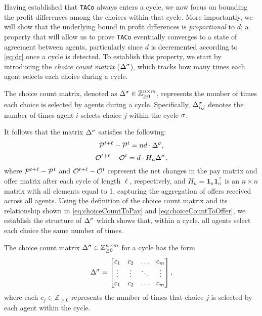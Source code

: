 Having established that \texttt{TACo} always enters a cycle, we now focus on bounding the profit differences among the choices within that cycle. More importantly, we will show that the underlying bound in profit differences is \textit{proportional} to $d$; a property that will allow us to prove  \texttt{TACo} eventually converges to a state of agreement between agents, particularly since $d$ is decremented according to \eqref{eq:dr} once a cycle is detected.  To establish this property, we start by introducing the \textit{choice count matrix} (\(\Delta^\sigma\)), which tracks how many times each agent selects each choice during a cycle.

\begin{definition} 
The choice count matrix, denoted as $\Delta^\sigma \in \mathbb{Z}_{\geq 0}^{n \times m}$, represents the number of times each choice is selected by agents during a cycle. Specifically, $\Delta^\sigma_{i,j}$ denotes the number of times agent $i$ selects choice $j$ within the cycle $\sigma$. 
\end{definition}

It follows that the matrix $\Delta^\sigma$ satisfies the following:
\begin{equation} \label{eq:choiceCountToPay}
    \mathcal{P}^{t+\ell} - \mathcal{P}^t = nd \cdot \Delta^\sigma,
\end{equation}
\begin{equation} \label{eq:choiceCountToOffer}
    \mathcal{O}^{t+\ell} - \mathcal{O}^t = d \cdot H_n \Delta^\sigma,
\end{equation}
where $\mathcal{P}^{t+\ell} - \mathcal{P}^t$ and $\mathcal{O}^{t+\ell} - \mathcal{O}^t$ represent the net changes in the pay matrix and offer matrix after each cycle of length $\ell$, respectively, and $H_n = \textbf{1}_n \textbf{1}_n^\top$ is an $n \times n$ matrix with all elements equal to 1, capturing the aggregation of offers received across all agents. Using the definition of the choice count matrix and its relationship shown in \cref{eq:choiceCountToPay} and \cref{eq:choiceCountToOffer}, we establish the structure of $\Delta^\sigma$ which shows that, within a cycle, all agents select each choice the same number of times.

\begin{lemma} \label{theorem:lemma3}
The choice count matrix $\Delta^\sigma \in \mathbb{Z}_{\geq 0}^{n \times m}$ for a cycle  has the form
\begin{equation}
\Delta^\sigma = \begin{bmatrix}
    c_1 & c_2 & \ldots & c_m \\ 
    \vdots & \vdots & \ddots & \vdots \\ 
    c_1 & c_2 & \ldots & c_m 
\end{bmatrix},
\end{equation}
where each $ c_j \in \mathbb{Z}_{\geq 0} $ represents the number of times that choice $ j $ is selected by each agent within the cycle.
\end{lemma}


